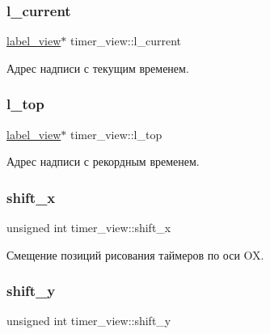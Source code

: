 \subsubsection{\texorpdfstring{l\+\_\+current}{l\_current}}
{\footnotesize\ttfamily \hyperlink{structlabel__view}{label\+\_\+view}$\ast$ timer\+\_\+view\+::l\+\_\+current}



Адрес надписи с текущим временем. 

\mbox{\label{structtimer__view_af1e48631c4b2eab39e49ac0ad7390b70}} 
\subsubsection{\texorpdfstring{l\+\_\+top}{l\_top}}
{\footnotesize\ttfamily \hyperlink{structlabel__view}{label\+\_\+view}$\ast$ timer\+\_\+view\+::l\+\_\+top}



Адрес надписи с рекордным временем. 

\mbox{\label{structtimer__view_aae1b218e8d1526bd4abe54898de94a04}} 
\subsubsection{\texorpdfstring{shift\+\_\+x}{shift\_x}}
{\footnotesize\ttfamily unsigned int timer\+\_\+view\+::shift\+\_\+x}



Смещение позиций рисования таймеров по оси OX. 

\mbox{\label{structtimer__view_a52be0cc476c2242a46407d3d729ecbe4}} 
\subsubsection{\texorpdfstring{shift\+\_\+y}{shift\_y}}
{\footnotesize\ttfamily unsigned int timer\+\_\+view\+::shift\+\_\+y}



